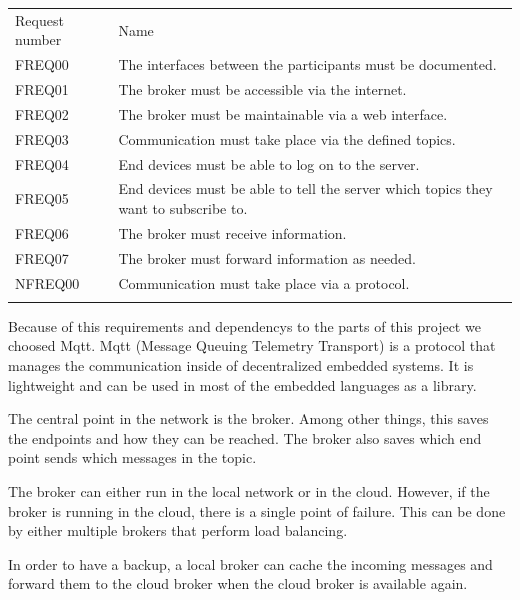 \begin{tabular}[h]{ll}
\vspace{10}
Request number & Name \\
FREQ00 & The interfaces between the participants must be documented.\\
FREQ01 & The broker must be accessible via the internet.\\
FREQ02 & The broker must be maintainable via a web interface.\\
FREQ03 & Communication must take place via the defined topics.\\
FREQ04 & End devices must be able to log on to the server.\\
FREQ05 & End devices must be able to tell the server which topics they want to subscribe to.\\
FREQ06 & The broker must receive information.\\
FREQ07 & The broker must forward information as needed.\\

NFREQ00 & Communication must take place via a protocol.\\
\vspace{10}
\end{tabular}
Because of this requirements and dependencys to the parts of this project we choosed Mqtt. Mqtt (Message Queuing Telemetry Transport) is a protocol that manages the communication inside of decentralized embedded systems. It is lightweight and can be used in most of the embedded languages as a library. 

The central point in the network is the broker. Among other things, this saves the endpoints and how they can be reached. The broker also saves which end point sends which messages in the topic.

The broker can either run in the local network or in the cloud. However, if the broker is running in the cloud, there is a single point of failure. This can be done by either multiple brokers that perform load balancing.

In order to have a backup, a local broker can cache the incoming messages and forward them to the cloud broker when the cloud broker is available again.

